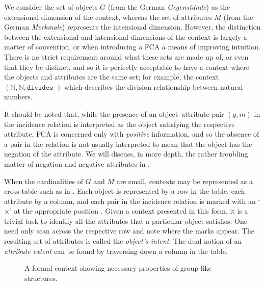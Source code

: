 We consider the set of objects $G$ (from the German \textit{Gegenstände}) as the extensional dimension of the context, whereas
the set of attributes $M$ (from the German \textit{Merkmale}) represents the intensional dimension. However, the
distinction between the extensional and intensional dimensions of the context is largely a matter of convention, or when
introducing a FCA a means of improving intuition. There is no strict requirement around what these sets are made up of, or
even that they be distinct, and so it is perfectly acceptable to have a context where the objects and attributes are the
same set; for example, the context $(\mathbb{N}, \mathbb{N}, \texttt{divides })$ which describes the division
relationship between natural numbers.

It should be noted that, while the presence of an object--attribute pair $(g,m)$ in the incidence relation is
interpreted as the object satisfying the respective attribute, FCA is concerned only with \textit{positive} information,
and so the absence of a pair in the relation is not usually interpreted to mean that the object has the negation of the attribute.
We will discuss, in more depth, the rather troubling matter of negation and negative attributes in
.

When the cardinalities of $G$ and $M$ are small, contexts may be represented as a cross-table such as in .
Each object is represented by a row in the table, each attribute by a column, and each pair in the incidence relation is
marked with an `$\times$' at the appropriate position \cite{ganter1999formal}. Given a context presented in this form,
it is a trivial task to identify all the attributes that a particular object satisfies: One need only scan across the respective
row and note where the marks appear. The resulting set of attributes is called the \textit{object's intent}. The dual
notion of an \textit{attribute extent} can be found by traversing down a column in the table.

\begin{figure}[H]
	\centering
	\small
	\begin{cxt}
		\label{cxt:grouplikes}   
		    
		   
		   
	\end{cxt}
	\caption{A formal context showing necessary properties of group-like structures.}
	\label{context:formal-context-group-structures}
\end{figure}

